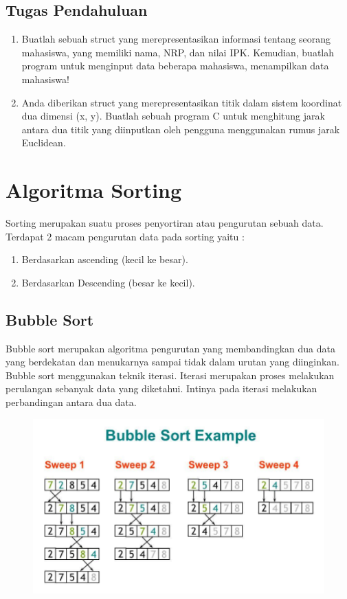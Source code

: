 \subsection{Tugas Pendahuluan}
\begin{enumerate}
    \item Buatlah sebuah struct yang merepresentasikan informasi tentang seorang mahasiswa, yang memiliki nama, NRP, dan nilai IPK. Kemudian, buatlah program untuk menginput data beberapa mahasiswa, menampilkan data mahasiswa!
    \item Anda diberikan struct yang merepresentasikan titik dalam sistem koordinat dua dimensi (x, y). Buatlah sebuah program C untuk menghitung jarak antara dua titik yang diinputkan oleh pengguna menggunakan rumus jarak Euclidean.
\end{enumerate}

\section{Algoritma Sorting}
Sorting merupakan suatu proses penyortiran atau pengurutan sebuah data.\\
Terdapat 2 macam pengurutan data pada sorting yaitu :
\begin{enumerate}
    \item Berdasarkan ascending (kecil ke besar).
    \item Berdasarkan Descending (besar ke kecil).
\end{enumerate}

\subsection{Bubble Sort}
Bubble sort merupakan algoritma pengurutan yang membandingkan dua data yang berdekatan dan menukarnya sampai tidak dalam urutan yang diinginkan.
Bubble sort menggunakan teknik iterasi. Iterasi merupakan proses melakukan perulangan sebanyak data yang diketahui.
Intinya pada iterasi melakukan perbandingan antara dua data.

\begin{figure}[H]
    \centering
    \includegraphics[width=0.7\linewidth]{P4/img/screenshot006.png}
    \caption{}
    \label{fig:enam}
\end{figure}

